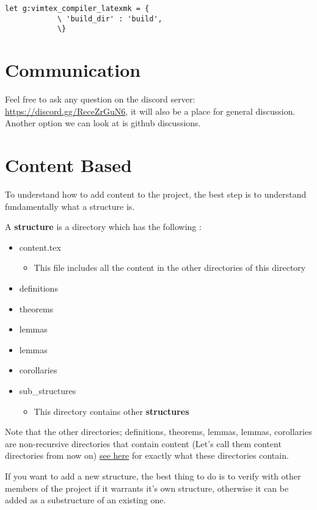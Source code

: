 \begin{lstlisting}
let g:vimtex_compiler_latexmk = {
            \ 'build_dir' : 'build',
            \}
\end{lstlisting}

 
\section*{Communication}

Feel free to ask any question on the discord server: \url{https://discord.gg/ReceZrGuN6}, it will also be a place for general discussion. Another option we can look at is github discussions.

\section*{Content Based}

To understand how to add content to the project, the best step is to understand fundamentally what a structure is.

A \textbf{structure} is a directory which has the following :
\begin{itemize}
    \item content.tex
    \begin{itemize}
        \item This file includes all the content in the other directories of this directory
    \end{itemize}
    \item definitions
    \item theorems
    \item lemmas
    \item lemmas
    \item corollaries
    \item sub\_structures
    \begin{itemize}
        \item This directory contains other \textbf{structures}
    \end{itemize}
\end{itemize}

Note that the other directories; definitions, theorems, lemmas, lemmas, corollaries are non-recursive directories that contain content (Let's call them content directories from now on) \hyperref[sec:knowledge]{see here} for exactly what these directories contain. 

If you want to add a new structure, the best thing to do is to verify with other members of the project if it warrants it's own structure, otherwise it can be added as a substructure of an existing one.

